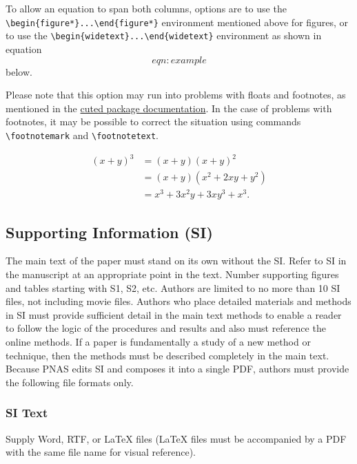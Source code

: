 \documentclass[9pt,twocolumn,twoside,]{pnas-new}
\begin{document}
To allow an equation to span both columns, options are to use the
\texttt{\textbackslash{}begin\{figure*\}...\textbackslash{}end\{figure*\}}
environment mentioned above for figures, or to use the
\texttt{\textbackslash{}begin\{widetext\}...\textbackslash{}end\{widetext\}}
environment as shown in equation \[eqn:example\] below.

Please note that this option may run into problems with floats and
footnotes, as mentioned in the \href{http://texdoc.net/pkg/cuted}{cuted
package documentation}. In the case of problems with footnotes, it may
be possible to correct the situation using commands
\texttt{\textbackslash{}footnotemark} and
\texttt{\textbackslash{}footnotetext}.

\[\begin{aligned}
(x+y)^3&=(x+y)(x+y)^2\\
       &=(x+y)(x^2+2xy+y^2) \label{eqn:example} \\
       &=x^3+3x^2y+3xy^3+x^3. 
\end{aligned}\]

\hypertarget{supporting-information-si}{%
\subsection*{Supporting Information
(SI)}\label{supporting-information-si}}

The main text of the paper must stand on its own without the SI. Refer
to SI in the manuscript at an appropriate point in the text. Number
supporting figures and tables starting with S1, S2, etc. Authors are
limited to no more than 10 SI files, not including movie files. Authors
who place detailed materials and methods in SI must provide sufficient
detail in the main text methods to enable a reader to follow the logic
of the procedures and results and also must reference the online
methods. If a paper is fundamentally a study of a new method or
technique, then the methods must be described completely in the main
text. Because PNAS edits SI and composes it into a single PDF, authors
must provide the following file formats only.

\hypertarget{si-text}{%
\subsubsection*{SI Text}\label{si-text}}

Supply Word, RTF, or LaTeX files (LaTeX files must be accompanied by a
PDF with the same file name for visual reference).
\end{document}
